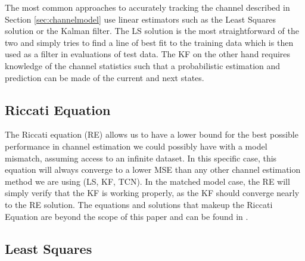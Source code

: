 \documentclass[twocolumn,letterpaper]{IEEEAerospaceCLS}  %
\begin{document}
The most common approaches to accurately tracking the channel described in Section \ref{sec:channelmodel} use linear estimators such as the Least Squares solution or the Kalman filter. The LS solution is the most straightforward of the two and simply tries to find a line of best fit to the training data which is then used as a filter in evaluations of test data. The KF on the other hand requires knowledge of the channel statistics such that a probabilistic estimation and prediction can be made of the current and next states. 

\subsection{Riccati Equation}

The Riccati equation (RE) allows us to have a lower bound for the best possible performance in channel estimation we could possibly have with a model mismatch, assuming access to an infinite dataset. In this specific case, this equation will always converge to a lower MSE than any other channel estimation method we are using (LS, KF, TCN). In the matched model case, the RE will simply verify that the KF is working properly, as the KF should converge nearly to the RE solution. The equations and solutions that makeup the Riccati Equation are beyond the scope of this paper and can be found in \cite{bar2004estimation}.

\subsection{Least Squares}
\end{document}
